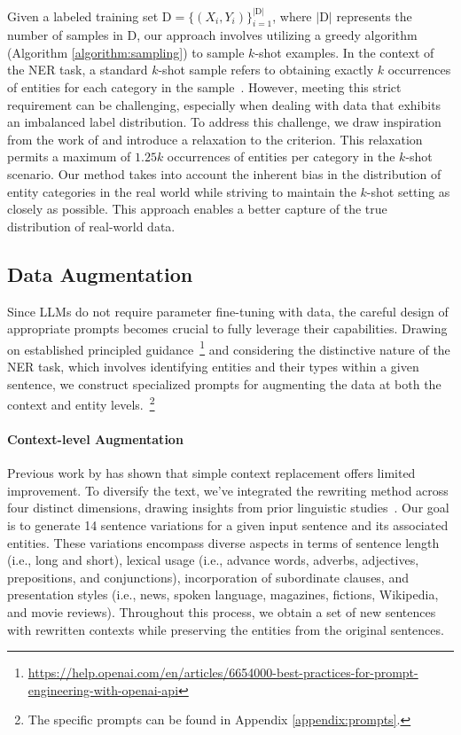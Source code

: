 \documentclass[11pt]{article}
\begin{document}
Given a labeled training set $\mathrm{D}=\{(X_i, Y_i)\}_{i=1}^{\vert \mathrm{D} \vert}$, where $\vert \mathrm{D} \vert$ represents the number of samples in $\mathrm{D}$, our approach involves utilizing a greedy algorithm (Algorithm \ref{algorithm:sampling}) to sample $k$-shot examples. In the context of the NER task, a standard $k$-shot sample refers to obtaining exactly $k$ occurrences of entities for each category in the sample~\cite{SNN}. However, meeting this strict requirement can be challenging, especially when dealing with data that exhibits an imbalanced label distribution. To address this challenge, we draw inspiration from the work of \citet{FEW-NERD} and introduce a relaxation to the criterion. This relaxation permits a maximum of $1.25k$ occurrences of entities per category in the $k$-shot scenario.
Our method takes into account the inherent bias in the distribution of entity categories in the real world while striving to maintain the $k$-shot setting as closely as possible. This approach enables a better capture of the true distribution of real-world data.




\subsection{Data Augmentation}
Since LLMs do not require parameter fine-tuning with data, the careful design of appropriate prompts becomes crucial to fully leverage their capabilities.
Drawing on established principled guidance~\footnote{\url{https://help.openai.com/en/articles/6654000-best-practices-for-prompt-engineering-with-openai-api}} and considering the distinctive nature of the NER task, which involves identifying entities and their types within a given sentence, we construct specialized prompts for augmenting the data at both the context and entity levels.~\footnote{The specific prompts can be found in Appendix \ref{appendix:prompts}.}


\paragraph{Context-level Augmentation} 
Previous work by \citet{MELM} has shown that simple context replacement offers limited improvement.
To diversify the text, we've integrated the rewriting method across four distinct dimensions, drawing insights from prior linguistic studies~\cite{Language}. Our goal is to generate 14 sentence variations for a given input sentence and its associated entities. These variations encompass diverse aspects in terms of sentence length (i.e., long and short), lexical usage (i.e., advance words, adverbs, adjectives, prepositions, and conjunctions), incorporation of subordinate clauses, and presentation styles (i.e., news, spoken language, magazines, fictions, Wikipedia, and movie reviews). Throughout this process, we obtain a set of new sentences with rewritten contexts while preserving the entities from the original sentences.
\end{document}
